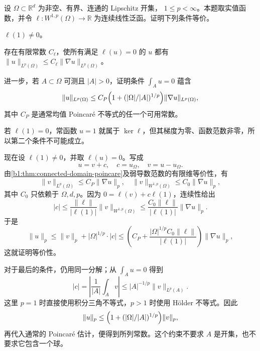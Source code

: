 \begin{exercise}\label{b1:ex:24-linear-normalization}
设 \(\Omega\subset\mathbb R^d\) 为非空、有界、连通的 Lipschitz 开集，
\(1\le p<\infty\)。本题取实值函数，并令
\(\ell:W^{1,p}(\Omega)\to\mathbb R\) 为连续线性泛函。证明下列条件等价。
\begin{equivalences}
 \item\label{b1:item:24-normalization-detects-constants}
 \(\ell(1)\ne0\)。
 \item\label{b1:item:24-normalization-poincare}
 存在有限常数 \(C_\ell\)，使所有满足 \(\ell(u)=0\) 的 \(u\) 都有
 \(\|u\|_{L^p(\Omega)}\le C_\ell\|\nabla u\|_{L^p(\Omega)}\)。
\end{equivalences}
进一步，若 \(A\subset\Omega\) 可测且 \(|A|>0\)，证明条件 \(\int_Au=0\) 蕴含
\[
 \|u\|_{L^p(\Omega)}
 \le C_P\Bigl(1+(|\Omega|/|A|)^{1/p}\Bigr)
          \|\nabla u\|_{L^p(\Omega)},
\]
其中 \(C_P\) 是通常均值 Poincaré 不等式的任一个可用常数。
\end{exercise}
\begin{solution}
若 \(\ell(1)=0\)，常函数 \(u=1\) 就属于 \(\ker\ell\)，但其梯度为零、函数范数非零，所以第二个条件不可能成立。

现在设 \(\ell(1)\ne0\)，并取 \(\ell(u)=0\)。写成
\[
 u=v+c,\quad c=u_\Omega,\quad v=u-u_\Omega.
\]
由\cref{b1:thm:connected-domain-poincare}及弱导数范数的有限维等价性，有
\[
 \|v\|_{L^p(\Omega)}\le C_P\|\nabla u\|_p,
 \quad \|v\|_{W^{1,p}(\Omega)}\le C_0\|\nabla u\|_p,
\]
其中 \(C_0\) 只依赖于 \(\Omega,d,p\)。因为
\(0=\ell(v)+c\ell(1)\)，连续性给出
\[
 |c|\le\frac{\|\ell\|}{|\ell(1)|}
                   \|v\|_{W^{1,p}(\Omega)}
       \le\frac{C_0\|\ell\|}{|\ell(1)|}\|\nabla u\|_p.
\]
于是
\[
 \|u\|_p\le\|v\|_p+|\Omega|^{1/p}\cdot|c|
 \le\left(C_P+
       \frac{|\Omega|^{1/p}C_0\|\ell\|}{|\ell(1)|}\right)
                 \|\nabla u\|_p,
\]
这就证明等价性。

对于最后的条件，仍用同一分解；从 \(\int_Au=0\) 得到
\[
 |c|=\left|\frac1{|A|}\int_Av\right|
       \le |A|^{-1/p}\|v\|_{L^p(A)}.
\]
这里 \(p=1\) 时直接使用积分三角不等式，\(p>1\) 时使用 Hölder 不等式。因此
\[
 \|u\|_p\le
     \Bigl(1+(|\Omega|/|A|)^{1/p}\Bigr)
                   \|v\|_p,
\]
再代入通常的 Poincaré 估计，便得到所列常数。这个约束不要求 \(A\) 是开集，也不要求它包含一个球。
\end{solution}

